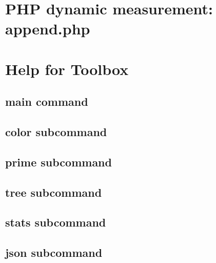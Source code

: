 \chapter{PHP dynamic measurement: append.php}
\label{ch:append.php}

\chapter{Help for Toolbox}

\begin{minipage}{\textwidth}
\section{main command}\label{sec:main}
\end{minipage}

\begin{minipage}{\textwidth}
\section{color subcommand}\label{sec:color}
\end{minipage}

\begin{minipage}{\textwidth}
\section{prime subcommand}\label{sec:prime}
\end{minipage}

\begin{minipage}{\textwidth}
\section{tree subcommand}\label{sec:tree}
\end{minipage}

\begin{minipage}{\textwidth}
\section{stats subcommand}\label{sec:stats}
\end{minipage}

\begin{minipage}{\textwidth}
\section{json subcommand}\label{sec:json}
\end{minipage}

